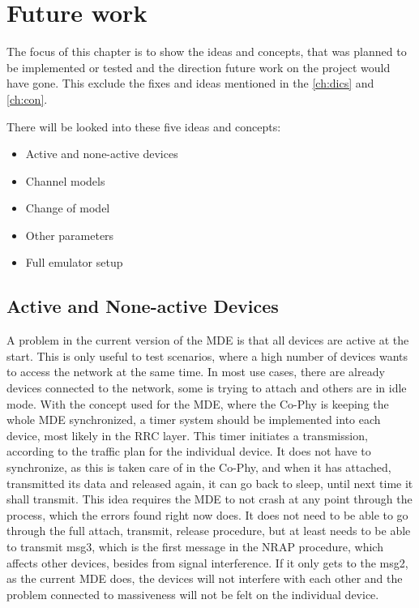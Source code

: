 \section{Future work}
\label{ch:Future}
The focus of this chapter is to show the ideas and concepts, that was planned to be implemented or tested and the direction future work on the project would have gone. This exclude the fixes and ideas mentioned in the \autoref{ch:dics} and \autoref{ch:con}.

There will be looked into these five ideas and concepts:

\begin{itemize}
\item Active and none-active devices
\item Channel models
\item Change of model
\item Other parameters
\item Full emulator setup
\end{itemize}

\subsection{Active and None-active Devices}
A problem in the current version of the MDE is that all devices are active at the start. This is only useful to test scenarios, where a high number of devices wants to access the network at the same time. In most use cases, there are already devices connected to the network, some is trying to attach and others are in idle mode. With the concept used for the MDE, where the Co-Phy is keeping the whole MDE synchronized, a timer system should be implemented into each device, most likely in the RRC layer. This timer initiates a transmission, according to the traffic plan for the individual device. It does not have to synchronize, as this is taken care of in the Co-Phy, and when it has attached, transmitted its data and released again, it can go back to sleep, until next time it shall transmit. This idea requires the MDE to not crash at any point through the process, which the errors found right now does. It does not need to be able to go through the full attach, transmit, release procedure, but at least needs to be able to transmit msg3, which is the first message in the NRAP procedure, which affects other devices, besides from signal interference. If it only gets to the msg2, as the current MDE does, the devices will not interfere with each other and the problem connected to massiveness will not be felt on the individual device.

